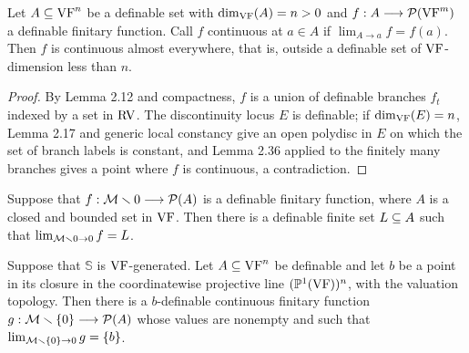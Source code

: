 \setcounter{theorem}{43}
\begin{lemma}
\label{fini-conti}
\leanok
{}
Let $A \subseteq \mathrm{VF}^n$ be a definable set with $\dim_{\mathrm{VF}}(A) = n > 0$ and $f : A \longrightarrow \mathcal{P}(\mathrm{VF}^m)$ a definable finitary function. Call $f$ continuous at $a \in A$ if $\lim_{A \to a} f = f(a)$. Then $f$ is continuous almost everywhere, that is, outside a definable set of $\mathrm{VF}$-dimension less than $n$.
\end{lemma}

\begin{proof}
\leanok
By Lemma 2.12 and compactness, $f$ is a union of definable branches $f_t$ indexed by a set in $\mathrm{RV}$. The discontinuity locus $E$ is definable; if $\dim_{\mathrm{VF}}(E) = n$, Lemma 2.17 and generic local constancy give an open polydisc in $E$ on which the set of branch labels is constant, and Lemma 2.36 applied to the finitely many branches gives a point where $f$ is continuous, a contradiction.
\end{proof}

\setcounter{theorem}{44}
\begin{lemma}
\label{lim-exists}
\leanok
{}
Suppose that $f : \mathcal{M} \smallsetminus 0 \longrightarrow \mathcal{P}(A)$ is a definable finitary function, where $A$ is a closed and bounded set in $\mathrm{VF}$. Then there is a definable finite set $L \subseteq A$ such that $\lim_{\mathcal{M} \smallsetminus 0 \to 0} f = L$.
\end{lemma}

\setcounter{theorem}{45}
\begin{lemma}
\label{curve-select}
\leanok
{}
Suppose that $\mathbb{S}$ is $\mathrm{VF}$-generated. Let $A \subseteq \mathrm{VF}^n$ be definable and let $b$ be a point in its closure in the coordinatewise projective line $(\mathbb{P}^1(\mathrm{VF}))^n$, with the valuation topology. Then there is a $b$-definable continuous finitary function $g : \mathcal{M} \smallsetminus \{0\} \longrightarrow \mathcal{P}(A)$ whose values are nonempty and such that $\lim_{\mathcal{M} \smallsetminus \{0\} \to 0} g = \{b\}$.
\end{lemma}

